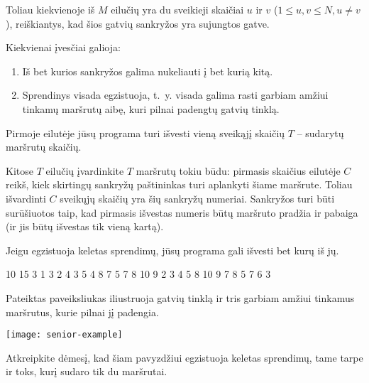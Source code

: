\documentclass{boi2014-lt}
\begin{document}
    Toliau kiekvienoje iš $M$ eilučių yra du sveikieji skaičiai $u$ ir $v$
    ($1 \le u, v \le N, u \neq v$), reiškiantys, kad šios gatvių sankryžos yra
    sujungtos gatve.

    Kiekvienai įvesčiai galioja:
    \begin{enumerate}
        \item Iš bet kurios sankryžos galima nukeliauti į bet kurią kitą.
        \item Sprendinys visada egzistuoja, t.~y. visada galima rasti garbiam
            amžiui tinkamų maršrutų aibę, kuri pilnai padengtų gatvių tinklą.
    \end{enumerate}

    \Output
    Pirmoje eilutėje jūsų programa turi išvesti vieną sveikąjį skaičių $T$ --
    sudarytų maršrutų skaičių.

    Kitose $T$ eilučių įvardinkite $T$ maršrutų tokiu būdu: pirmasis skaičius
    eilutėje $C$ reikš, kiek skirtingų sankryžų paštininkas turi aplankyti šiame
    maršrute. Toliau išvardinti $C$ sveikųjų skaičių yra šių sankryžų numeriai.
    Sankryžos turi būti surūšiuotos taip, kad pirmasis išvestas numeris būtų
    maršruto pradžia ir pabaiga (ir jis būtų išvestas tik vieną kartą).

    Jeigu egzistuoja keletas sprendimų, jūsų programa gali išvesti bet kurų
    iš jų.

    \Example

    \example
    {
        10 15  3  1 3  2 4  3 5  4 8  7  5 7  8  10  9
    }
    {
        2 3 4 5 8 10 9  7 8  5 7 6 3
    }
    {
        Pateiktas paveiksliukas iliustruoja gatvių tinklą ir tris garbiam amžiui
        tinkamus maršrutus, kurie pilnai jį padengia.

        \texttt{[image: senior-example]}

        Atkreipkite dėmesį, kad šiam pavyzdžiui egzistuoja keletas sprendimų,
        tame tarpe ir toks, kurį sudaro tik du maršrutai.
    }
\end{document}
